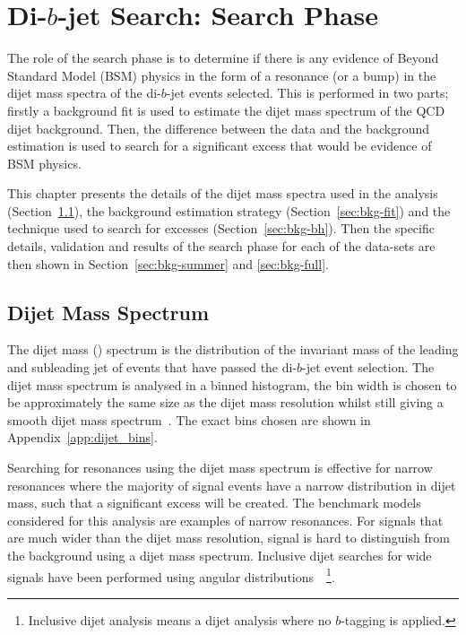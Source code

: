 \chapter{Di-$b$-jet Search: Search Phase}
\label{sec:bkg}

\vspace{-0.5em}
The role of the search phase is to determine if there is any evidence of Beyond Standard Model (BSM)
physics in the form of a resonance (or a bump) in the dijet mass spectra of the di-$b$-jet events selected.
This is performed in two parts; firstly a background fit is used to estimate
the dijet mass spectrum of the QCD dijet background.
Then, the difference between the data and the background estimation is used 
to search for a significant excess that would be evidence of BSM physics.

This chapter presents
the details of the dijet mass  spectra used in the analysis (Section~\ref{sec:bkg-mjj}),
the background estimation strategy (Section~\ref{sec:bkg-fit}) and
the technique used to search for excesses (Section~\ref{sec:bkg-bh}).
Then the specific details, validation and results of the search phase for each of the data-sets are
then shown in Section~\ref{sec:bkg-summer} and \ref{sec:bkg-full}.

\section{Dijet Mass Spectrum}
\label{sec:bkg-mjj}

The dijet mass (\mjj) spectrum
is the distribution of the invariant mass of the leading and subleading jet
of events that have passed the di-$b$-jet event selection.
The dijet mass spectrum is analysed in a binned histogram,
the bin width is chosen to be approximately the same size as the dijet mass resolution
whilst still giving a smooth dijet mass spectrum~\cite{dijet-mori16_paper}.
The exact bins chosen are shown in Appendix~\ref{app:dijet_bins}.

Searching for resonances using the dijet mass spectrum is effective
for narrow resonances where the majority of signal events have a narrow distribution in dijet mass,
such that a significant excess will be created.
The benchmark models considered for this analysis are examples of narrow resonances.
For signals that are much wider than the dijet mass resolution,
signal is hard to distinguish from the background using a dijet mass spectrum.
Inclusive dijet searches for wide signals have been performed using angular distributions~\cite{dijet-mori16_paper}~\footnote{Inclusive
  dijet analysis means a dijet analysis where no $b$-tagging is applied.}.

